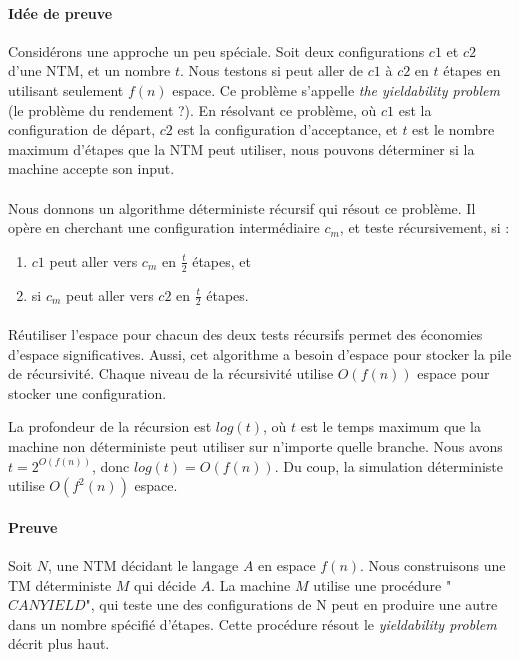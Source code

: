 \paragraph{Idée de preuve} Considérons une approche un peu spéciale. Soit deux configurations $c1$ et $c2$ d'une NTM, et un nombre $t$. Nous testons si peut aller de $c1$ à $c2$ en $t$ étapes en utilisant seulement $f(n)$ espace. Ce problème s'appelle \textit{the yieldability problem} (le problème du rendement ?). En résolvant ce problème, où $c1$ est la configuration de départ, $c2$ est la configuration d'acceptance, et $t$ est le nombre maximum d'étapes que la NTM peut utiliser, nous pouvons déterminer si la machine accepte son input.

\paragraph{}
Nous donnons un algorithme déterministe récursif qui résout ce problème. Il opère en cherchant une configuration intermédiaire $c_{m}$, et teste récursivement, si :
\begin{enumerate}
\item $c1$ peut aller vers $c_{m}$ en $\frac{t}{2}$ étapes, et
\item si $c_{m}$ peut aller vers $c2$ en $\frac{t}{2}$ étapes.
\end{enumerate}

\paragraph{}
Réutiliser l'espace pour chacun des deux tests récursifs permet des économies d'espace significatives. Aussi, cet algorithme a besoin d'espace pour stocker la pile de récursivité. Chaque niveau de la récursivité utilise $O(f(n))$ espace pour stocker une configuration.

La profondeur de la récursion est $log(t)$, où $t$ est le temps maximum que la machine non déterministe peut utiliser sur n'importe quelle branche. Nous avons $t = 2^{O(f(n))}$, donc $log(t) = O(f(n))$. Du coup, la simulation déterministe utilise $O(f^{2}(n))$ espace.

\paragraph{Preuve} Soit $N$, une NTM décidant le langage $A$ en espace $f(n)$. Nous construisons une TM déterministe $M$ qui décide $A$. La machine $M$ utilise une procédure "$CANYIELD$", qui teste une des configurations de N peut en produire une autre dans un nombre spécifié d'étapes. Cette procédure résout le \textit{yieldability problem} décrit plus haut.

